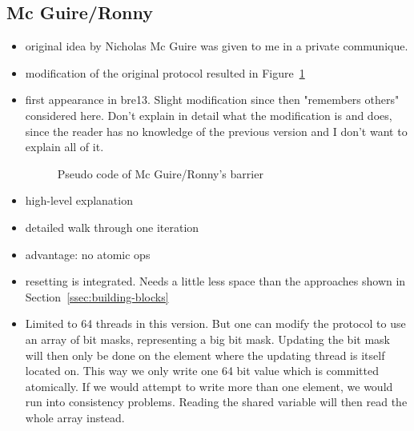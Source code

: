 \documentclass[a4paper, 10pt]{article}
\begin{document}
\begin{enumerate}
\subsection{Mc Guire/Ronny}
\label{ssec:new-nmg}
\begin{itemize}
	\item original idea by Nicholas Mc Guire was given to me in a private communique.
	\item modification of the original protocol resulted in Figure~\ref{fig:nmg-ronny-with-reset}
	\item first appearance in bre13\cite{bre13}. Slight modification since then "remembers others" considered here. Don't explain in detail what the modification is and does, since the reader has no knowledge of the previous version and I don't want to explain all of it.
		\begin{figure}[htbp]
			\centering
			
			\caption{Pseudo code of Mc Guire/Ronny's barrier}
			\label{fig:nmg-ronny-with-reset}
		\end{figure}
	\item high-level explanation
	\item detailed walk through one iteration
	\item advantage: no atomic ops
	\item resetting is integrated. Needs a little less space than the approaches shown in Section~\ref{ssec:building-blocks}
	\item Limited to 64 threads in this version. But one can modify the protocol to use an array of bit masks, representing a big bit mask. Updating the bit mask will then only be done on the element where the updating thread is itself located on. This way we only write one 64 bit value which is committed atomically. If we would attempt to write more than one element, we would run into consistency problems. Reading the shared variable will then read the whole array instead.
\end{itemize}


\end{enumerate}
\end{document}
